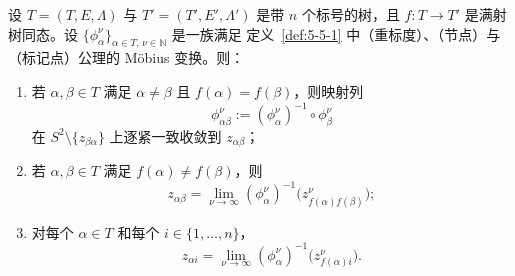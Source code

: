 \begin{lemma}\label{lem:5-5-6}
设 $T=(T,E,\Lambda)$ 与 $T'=(T',E',\Lambda')$ 是带 $n$ 个标号的树，且
$f:T\to T'$ 是满射树同态。设
$\{\phi_\alpha^\nu\}_{\alpha\in T,\,\nu\in\mathbb N}$ 是一族满足
定义~\ref{def:5-5-1} 中（重标度）、（节点）与（标记点）公理的 Möbius 变换。则：
\begin{enumerate}[label=(\roman*),leftmargin=3em]
\item 若 $\alpha,\beta\in T$ 满足 $\alpha\ne\beta$ 且
$f(\alpha)=f(\beta)$，则映射列
\[
  \phi_{\alpha\beta}^\nu
  :=(\phi_\alpha^\nu)^{-1}\circ\phi_\beta^\nu
\]
在 $S^2\setminus\{z_{\beta\alpha}\}$ 上逐紧一致收敛到 $z_{\alpha\beta}$；
\item 若 $\alpha,\beta\in T$ 满足 $f(\alpha)\ne f(\beta)$，则
\[
  z_{\alpha\beta}
  =\lim_{\nu\to\infty}
  (\phi_\alpha^\nu)^{-1}
  \bigl(z_{f(\alpha)f(\beta)}^\nu\bigr);
\]
\item 对每个 $\alpha\in T$ 和每个 $i\in\{1,\ldots,n\}$，
\[
  z_{\alpha i}
  =\lim_{\nu\to\infty}
  (\phi_\alpha^\nu)^{-1}
  \bigl(z_{f(\alpha)i}^\nu\bigr).
\]
\end{enumerate}
\end{lemma}

